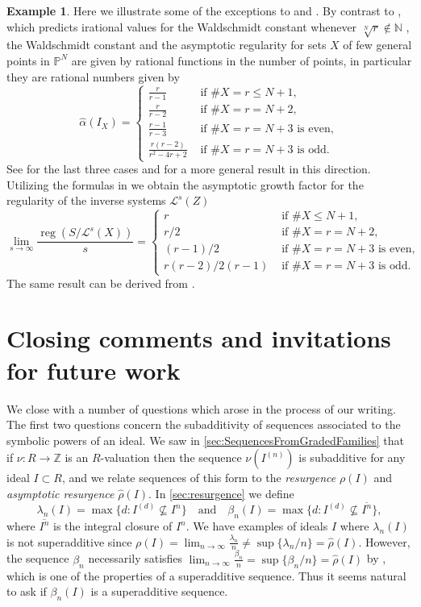 \documentclass[12pt, reqno]{amsart}
\numberwithin{equation}{section}
\newcommand{\wa}{\widehat{\alpha}}
\newcommand{\wrho}{\widehat{\rho}}
\newcommand{\N}{{\mathbb N}}
\renewcommand{\P}{{\mathbb P}}
\newcommand{\Z}{{\mathbb Z}}
\renewcommand{\L}{{\mathcal L}}
\DeclareMathOperator{\reg}{reg}
\theoremstyle{plain} %
\theoremstyle{definition}
\newtheorem{ex}[thm]{Example}
\theoremstyle{remark}
\renewcommand{\L}{\mathcal{L}}
\begin{document}
\begin{ex}
Here we illustrate some of the exceptions to   and .
By contrast to  , which predicts irational values for the Waldschmidt constant whenever $\sqrt[N]{r}\not \in\N$ , the Waldschmidt constant and the asymptotic regularity for sets $X$ of  few general points in $\P^N$  are given by rational functions in the number of points,  in particular they are rational numbers given by
\[
\wa(I_X)=
\begin{cases}
\frac{r}{r-1} & \text{ if } \#X=r\leq N+1,\\
\frac{r}{r-2} & \text{ if } \#X=r=N+2,\\
\frac{r-1}{r-3} & \text{ if } \#X=r=N+3 \text { is even}, \\
\frac{r(r-2)}{r^2-4r+2} & \text{ if } \#X=r=N+3 \text{ is odd}.
\end{cases}
\]
See \cite[Proposition B.1.1]{DHST14} for the last three cases and \cite[Proposition 5.1]{NT19} for a more general result in this direction. Utilizing the formulas in  we obtain the asymptotic growth factor for the regularity of the inverse systems $\L^s(Z)$  
\[
\lim_{s\to\infty} \frac{\reg(S/\L^s(X))}{s}=
\begin{cases}
r & \text{ if } \#X\leq N+1,\\
r/2 & \text{ if } \#X=r=N+2,\\
(r-1)/2 & \text{ if } \#X=r=N+3 \text { is even}, \\
r(r-2)/2(r-1) & \text{ if } \#X=r=N+3 \text{ is odd}.
\end{cases}
\]
The same result can be derived from \cite[Theorem 4.4 and Theorem 4.7]{NT19}. 
\end{ex}


\section{Closing comments and invitations for future work}
\label{s:open}

We close with a number of questions which arose in the process of our writing.  The first two questions concern the subadditivity of sequences associated to the symbolic powers of an ideal.  We saw in \cref{sec:SequencesFromGradedFamilies} that if $\nu:R\to\Z$ is an $R$-valuation then the sequence $\nu(I^{(n)})$ is subadditive for any ideal $I\subset R$, and we relate sequences of this form to the \textit{resurgence} $\rho(I)$ and \textit{asymptotic resurgence} $\wrho(I)$.  In \cref{sec:resurgence} we define
\[
\lambda_n(I)=\max\{d:I^{(d)}\not\subseteq I^n\}\quad\mbox{and}\quad\beta_n(I)=\max\{d:I^{(d)}\not\subseteq \overline{I^n}\},
\]
where $\overline{I^n}$ is the integral closure of $I^n$.  We have examples of ideals $I$ where $\lambda_n(I)$ is not superadditive since $\rho(I)=\lim_{n\to\infty} \frac{\lambda_n}{n}\neq \sup\{\lambda_n/n\}=\wrho(I)$.  However, the sequence $\beta_n$ necessarily satisfies $\lim_{n\to\infty}\frac{\beta_n}{n}=\sup\{\beta_n/n\}=\wrho(I)$ by , which is one of the properties of a superadditive sequence.  Thus it seems natural to ask if $\beta_n(I)$ is a superadditive sequence.
\end{document}
